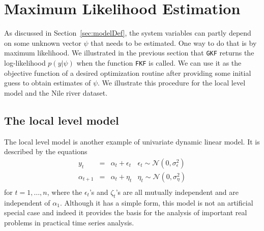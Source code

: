 \documentclass{article}
\newcommand{\GKF}{\texttt{GKF}\xspace}
\begin{document}
\section{Maximum Likelihood Estimation}
\label{sec:MLE}

As discussed in Section~\ref{sec:modelDef}, the system variables can partly depend on some
unknown vector $\psi$ that needs to be estimated. One way to do that is by maximum
likelihood. We illustrated in the previous section that \GKF returns the log-likelihood
$p(y|\psi)$ when the function \texttt{FKF} is called. We can use it as the objective function
of a desired optimization routine after providing some initial guess to obtain estimates of
$\psi$. We illustrate this procedure for the local level model and the Nile river dataset.

\subsection{The local level model}
The local level model is another example of univariate dynamic linear model. It is described
by the equations
\begin{equation*}
   \begin{array}{rccl}
     y_t & = & \alpha_t + \epsilon_t &  \epsilon_t \sim  \mathcal{N}(0,\sigma_\epsilon^2) \\
     \alpha_{t+1} & = & \alpha_t + \eta_t &  \eta_t \sim  \mathcal{N}(0,\sigma_\eta^2) \\
    \end{array}
  \label{eq:measurementNLNG}
\end{equation*}
for $t = 1,\dots, n $, where the $\epsilon_t$’s and $\zeta_t$’s are all mutually independent
and are independent of $\alpha_1$. Although it has a simple form, this model is not an
artificial special case and indeed it provides the basis for the analysis of important real
problems in practical time series analysis.
\end{document}
